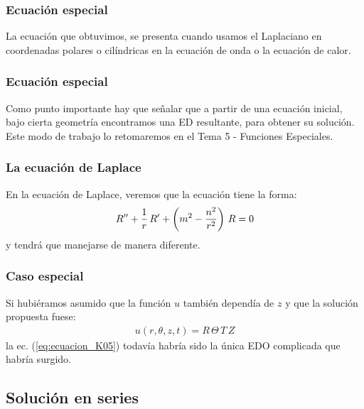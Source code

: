 \documentclass[12pt]{beamer}
\begin{document}
\begin{frame}
\frametitle{Ecuación especial}
La ecuación que obtuvimos, se presenta cuando usamos el Laplaciano en coordenadas polares o cilíndricas en la ecuación de onda o la ecuación de calor.
\end{frame}
\begin{frame}
\frametitle{Ecuación especial}
Como punto importante hay que señalar que a partir de una ecuación inicial, bajo cierta geometría encontramos una ED resultante, para obtener su solución. Este modo de trabajo lo retomaremos en el Tema 5 - Funciones Especiales.
\end{frame}
\begin{frame}
\frametitle{La ecuación de Laplace}
En la ecuación de Laplace, veremos que la ecuación tiene la forma:
\pause
\begin{align*}
{R}^{\prime \prime} + \dfrac{1}{r} \, {R}^{\prime} + \left( m^{2} - \dfrac{n^{2}}{r^{2}} \right) \, R = 0
\end{align*}
y tendrá que manejarse de manera diferente.
\end{frame}
\begin{frame}
\frametitle{Caso especial}
Si hubiéramos asumido que la función $u$ también dependía de $z$ y que la solución propuesta fuese:
\pause
\begin{align*}
u (r, \theta, z, t) =  R \, \Theta \, T \, Z
\end{align*}
la ec. (\ref{eq:ecuacion_K05}) todavía habría sido la única EDO complicada que habría surgido.
\end{frame}

\subsection{Solución en series}
\end{document}
